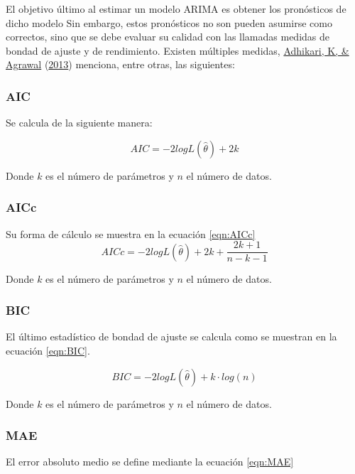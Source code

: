 \documentclass[
]{article}
\begin{document}
El objetivo último al estimar un modelo ARIMA es obtener los pronósticos
de dicho modelo Sin embargo, estos pronósticos no son pueden asumirse
como correctos, sino que se debe evaluar su calidad con las llamadas
medidas de bondad de ajuste y de rendimiento. Existen múltiples medidas,
\protect\hyperlink{ref-medidas}{Adhikari, K, \& Agrawal}
(\protect\hyperlink{ref-medidas}{2013}) menciona, entre otras, las
siguientes:

\subsubsection{AIC}

Se calcula de la siguiente manera:

\begin{equation}
\label{eqn:AIC}
AIC=-2logL\left(\hat\theta\right)+2k
\end{equation}

Donde \(k\) es el número de parámetros y \(n\) el número de datos.

\subsubsection{AICc}

Su forma de cálculo se muestra en la ecuación \ref{eqn:AICc}
\begin{equation}
\label{eqn:AICc}
AICc=-2logL\left(\hat\theta\right)+2k+\frac{2k+1}{n-k-1}
\end{equation}

Donde \(k\) es el número de parámetros y \(n\) el número de datos.

\subsubsection{BIC}

El último estadístico de bondad de ajuste se calcula como se muestran en
la ecuación \ref{eqn:BIC}.

\begin{equation}
\label{eqn:BIC}
BIC=-2logL\left(\hat\theta\right)+k\cdot log(n)
\end{equation}

Donde \(k\) es el número de parámetros y \(n\) el número de datos.

\subsubsection{MAE}

El error absoluto medio se define mediante la ecuación \ref{eqn:MAE}
\end{document}
